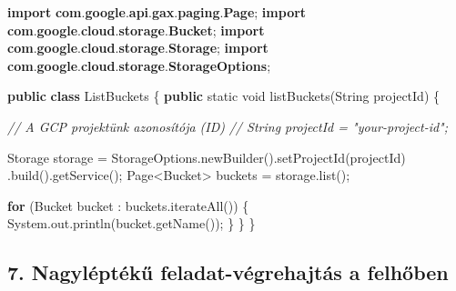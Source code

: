 \documentclass[
]{article}
\newenvironment{Shaded}{}{}
\newcommand{\BuiltInTok}[1]{\textcolor[rgb]{0.00,0.50,0.00}{#1}}
\newcommand{\CommentTok}[1]{\textcolor[rgb]{0.38,0.63,0.69}{\textit{#1}}}
\newcommand{\ControlFlowTok}[1]{\textcolor[rgb]{0.00,0.44,0.13}{\textbf{#1}}}
\newcommand{\DataTypeTok}[1]{\textcolor[rgb]{0.56,0.13,0.00}{#1}}
\newcommand{\FunctionTok}[1]{\textcolor[rgb]{0.02,0.16,0.49}{#1}}
\newcommand{\ImportTok}[1]{\textcolor[rgb]{0.00,0.50,0.00}{\textbf{#1}}}
\newcommand{\KeywordTok}[1]{\textcolor[rgb]{0.00,0.44,0.13}{\textbf{#1}}}
\newcommand{\NormalTok}[1]{#1}
\newcommand{\OperatorTok}[1]{\textcolor[rgb]{0.40,0.40,0.40}{#1}}
\begin{document}
\begin{Shaded}
\begin{Highlighting}[]
\KeywordTok{import} \ImportTok{com}\OperatorTok{.}\ImportTok{google}\OperatorTok{.}\ImportTok{api}\OperatorTok{.}\ImportTok{gax}\OperatorTok{.}\ImportTok{paging}\OperatorTok{.}\ImportTok{Page}\OperatorTok{;}
\KeywordTok{import} \ImportTok{com}\OperatorTok{.}\ImportTok{google}\OperatorTok{.}\ImportTok{cloud}\OperatorTok{.}\ImportTok{storage}\OperatorTok{.}\ImportTok{Bucket}\OperatorTok{;}
\KeywordTok{import} \ImportTok{com}\OperatorTok{.}\ImportTok{google}\OperatorTok{.}\ImportTok{cloud}\OperatorTok{.}\ImportTok{storage}\OperatorTok{.}\ImportTok{Storage}\OperatorTok{;}
\KeywordTok{import} \ImportTok{com}\OperatorTok{.}\ImportTok{google}\OperatorTok{.}\ImportTok{cloud}\OperatorTok{.}\ImportTok{storage}\OperatorTok{.}\ImportTok{StorageOptions}\OperatorTok{;}

\KeywordTok{public} \KeywordTok{class}\NormalTok{ ListBuckets }\OperatorTok{\{}
  \KeywordTok{public} \DataTypeTok{static} \DataTypeTok{void} \FunctionTok{listBuckets}\OperatorTok{(}\BuiltInTok{String}\NormalTok{ projectId}\OperatorTok{)} \OperatorTok{\{}
    
    \CommentTok{// A GCP projektünk azonosítója (ID)}
    \CommentTok{// String projectId = "your{-}project{-}id";}

\NormalTok{    Storage storage }\OperatorTok{=}\NormalTok{ StorageOptions}\OperatorTok{.}\FunctionTok{newBuilder}\OperatorTok{().}\FunctionTok{setProjectId}\OperatorTok{(}\NormalTok{projectId}\OperatorTok{)}
            \OperatorTok{.}\FunctionTok{build}\OperatorTok{().}\FunctionTok{getService}\OperatorTok{();}
\NormalTok{    Page}\OperatorTok{\textless{}}\NormalTok{Bucket}\OperatorTok{\textgreater{}}\NormalTok{ buckets }\OperatorTok{=}\NormalTok{ storage}\OperatorTok{.}\FunctionTok{list}\OperatorTok{();}

    \ControlFlowTok{for} \OperatorTok{(}\NormalTok{Bucket bucket }\OperatorTok{:}\NormalTok{ buckets}\OperatorTok{.}\FunctionTok{iterateAll}\OperatorTok{())} \OperatorTok{\{}
      \BuiltInTok{System}\OperatorTok{.}\FunctionTok{out}\OperatorTok{.}\FunctionTok{println}\OperatorTok{(}\NormalTok{bucket}\OperatorTok{.}\FunctionTok{getName}\OperatorTok{());}
    \OperatorTok{\}}
  \OperatorTok{\}}
\OperatorTok{\}}
\end{Highlighting}
\end{Shaded}

\hypertarget{nagyluxe9ptuxe9kux171-feladat-vuxe9grehajtuxe1s-a-felhux151ben}{%
\subsection{7. Nagyléptékű feladat-végrehajtás a
felhőben}\label{nagyluxe9ptuxe9kux171-feladat-vuxe9grehajtuxe1s-a-felhux151ben}}
\end{document}
